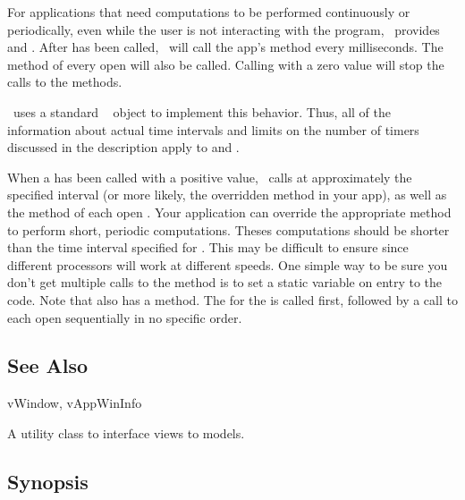 For applications that need computations to be performed continuously
or periodically, even while the user is not interacting with the program,
\V\ provides  and . After
 has been called, \V\ will call the app's
 method every  milliseconds.
The  method of every open 
will also be called. Calling  with a zero
value will stop the calls to the  methods.

\V\ uses a standard \V\  object to implement this
behavior. Thus, all of the information about actual time intervals
and limits on the number of timers discussed in the 
description apply to  and .


When a  has been called with a positive value,
\V\ calls  at approximately the specified
interval (or more
likely, the overridden method in your app), as well as the
 method of each open .
Your application can override the appropriate 
method to perform short, periodic computations. Theses
computations should be shorter than the time interval specified for
. This may be difficult to ensure since
different processors will work at different speeds. One simple
way to be sure you don't get multiple calls to the 
method is to set a static variable on entry to the code. Note
that  also has a  method.
The  for the  is called first,
followed by a call to each open 
sequentially in no specific order.


\subsection* {See Also}

vWindow, vAppWinInfo



A utility class to interface views to models.
\subsection* {Synopsis}


